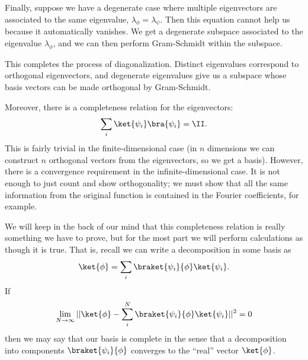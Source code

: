 Finally, suppose we have a degenerate case where multiple eigenvectors are associated to the same eigenvalue, $\lambda_\phi=\lambda_\psi$. Then this equation cannot help us because it automatically vanishes. We get a degenerate subspace associated to the eigenvalue $\lambda_\phi$, and we can then perform Gram-Schmidt within the subspace.

This completes the process of diagonalization. Distinct eigenvalues correspond to orthogonal eigenvectors, and degenerate eigenvalues give us a subspace whose basis vectors can be made orthogonal by Gram-Schmidt.

Moreover, there is a completeness relation for the eigenvectors:
\begin{equation}
    \sum_i \ket{\psi_i} \bra{\psi_i} = \II.
\end{equation}
This is fairly trivial in the finite-dimensional case (in $n$ dimensions we can construct $n$ orthogonal vectors from the eigenvectors, so we get a basis). However, there is a convergence requirement in the infinite-dimensional case. It is not enough to just count and show orthogonality; we must show that all the same information from the original function is contained in the Fourier coefficients, for example.

We will keep in the back of our mind that this completeness relation is really something we have to prove, but for the most part we will perform calculations as though it is true. That is, recall we can write a decomposition in some basis as
\begin{equation}
    \ket{\phi} =\sum_i \braket{\psi_i}{\phi} \ket{\psi_i}.
\end{equation}
If
\begin{equation}
    \lim_{N\to \infty} ||\ket{\phi} - \sum_i^N \braket{\psi_i}{\phi} \ket{\psi_i}||^2 =0
\end{equation}
then we may say that our basis is complete in the sense that a decomposition into components $\braket{\psi_i}{\phi}$ converges to the ``real'' vector $\ket{\phi}$.

